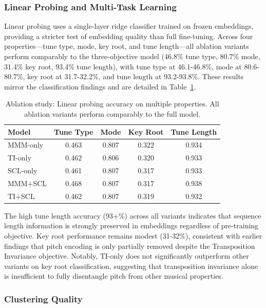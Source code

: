 \documentclass[]{interact}
\theoremstyle{plain}
\theoremstyle{definition}
\theoremstyle{remark}
\begin{document}
\subsubsection{Linear Probing and Multi-Task Learning}

Linear probing uses a single-layer ridge classifier trained on frozen embeddings, providing a stricter test of embedding quality than full fine-tuning. Across four properties—tune type, mode, key root, and tune length—all ablation variants perform comparably to the three-objective model (46.8\% tune type, 80.7\% mode, 31.4\% key root, 93.4\% tune length), with tune type at 46.1-46.8\%, mode at 80.6-80.7\%, key root at 31.7-32.2\%, and tune length at 93.2-93.8\%. These results mirror the classification findings and are detailed in Table~\ref{tab:ablation_linear_probing}.

\begin{table}[H]
\centering
\caption{Ablation study: Linear probing accuracy on multiple properties. All ablation variants perform comparably to the full model.}
\label{tab:ablation_linear_probing}
\begin{tabular}{lcccc}
\toprule
\textbf{Model} & \textbf{Tune Type} & \textbf{Mode} & \textbf{Key Root} & \textbf{Tune Length} \\
\midrule
MMM-only & 0.463 & 0.807 & 0.322 & 0.934 \\
TI-only & 0.462 & 0.806 & 0.320 & 0.933 \\
SCL-only & 0.461 & 0.807 & 0.317 & 0.933 \\
MMM+SCL & 0.468 & 0.807 & 0.317 & 0.938 \\
TI+SCL & 0.462 & 0.807 & 0.319 & 0.932 \\
\bottomrule
\end{tabular}
\end{table}

The high tune length accuracy (93+\%) across all variants indicates that sequence length information is strongly preserved in embeddings regardless of pre-training objective. Key root performance remains modest (31-32\%), consistent with earlier findings that pitch encoding is only partially removed despite the Transposition Invariance objective. Notably, TI-only does not significantly outperform other variants on key root classification, suggesting that transposition invariance alone is insufficient to fully disentangle pitch from other musical properties.

\subsubsection{Clustering Quality}
\end{document}

